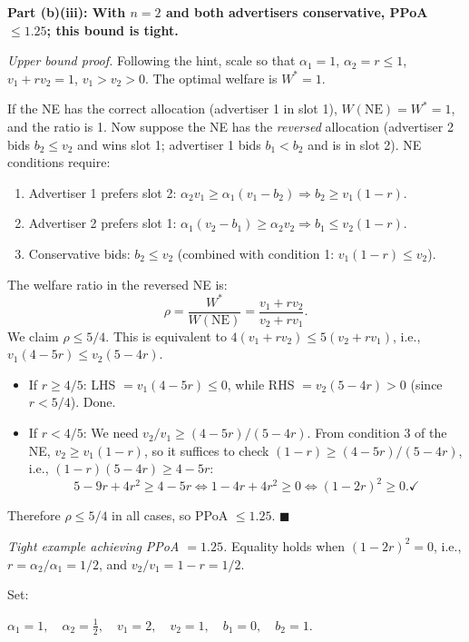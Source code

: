 \documentclass{article}
\begin{document}
\medskip
\noindent\textbf{Part (b)(iii): With $n=2$ and both advertisers conservative, PPoA $\leq 1.25$; this bound is tight.}

\medskip
\noindent\textit{Upper bound proof.} Following the hint, scale so that $\alpha_1 = 1$, $\alpha_2 = r \leq 1$, $v_1 + r v_2 = 1$, $v_1 > v_2 > 0$. The optimal welfare is $W^* = 1$.

If the NE has the correct allocation (advertiser 1 in slot 1), $W(\text{NE}) = W^* = 1$, and the ratio is 1. Now suppose the NE has the \emph{reversed} allocation (advertiser 2 bids $b_2 \leq v_2$ and wins slot 1; advertiser 1 bids $b_1 < b_2$ and is in slot 2). NE conditions require:
\begin{enumerate}
    \item Advertiser 1 prefers slot 2: $\alpha_2 v_1 \geq \alpha_1(v_1 - b_2) \Rightarrow b_2 \geq v_1(1-r).$
    \item Advertiser 2 prefers slot 1: $\alpha_1(v_2 - b_1) \geq \alpha_2 v_2 \Rightarrow b_1 \leq v_2(1-r).$
    \item Conservative bids: $b_2 \leq v_2$ (combined with condition 1: $v_1(1-r) \leq v_2$).
\end{enumerate}

The welfare ratio in the reversed NE is:
$$\rho = \frac{W^*}{W(\text{NE})} = \frac{v_1 + rv_2}{v_2 + rv_1}.$$
We claim $\rho \leq 5/4$. This is equivalent to $4(v_1 + rv_2) \leq 5(v_2 + rv_1)$, i.e., $v_1(4-5r) \leq v_2(5-4r)$.

\begin{itemize}
    \item If $r \geq 4/5$: LHS $= v_1(4-5r) \leq 0$, while RHS $= v_2(5-4r) > 0$ (since $r < 5/4$). Done.
    \item If $r < 4/5$: We need $v_2/v_1 \geq (4-5r)/(5-4r)$. From condition 3 of the NE, $v_2 \geq v_1(1-r)$, so it suffices to check $(1-r) \geq (4-5r)/(5-4r)$, i.e., $(1-r)(5-4r) \geq 4-5r$:
    $$5 - 9r + 4r^2 \geq 4-5r \iff 1 - 4r + 4r^2 \geq 0 \iff (1-2r)^2 \geq 0. \checkmark$$
\end{itemize}
Therefore $\rho \leq 5/4$ in all cases, so PPoA $\leq 1.25$. $\blacksquare$

\medskip
\noindent\textit{Tight example achieving PPoA $= 1.25$.} Equality holds when $(1-2r)^2 = 0$, i.e., $r = \alpha_2/\alpha_1 = 1/2$, and $v_2/v_1 = 1-r = 1/2$.

Set:
\begin{center}
    $\alpha_1 = 1, \quad \alpha_2 = \tfrac{1}{2}, \quad v_1 = 2, \quad v_2 = 1, \quad b_1 = 0, \quad b_2 = 1.$
\end{center}
\end{document}
